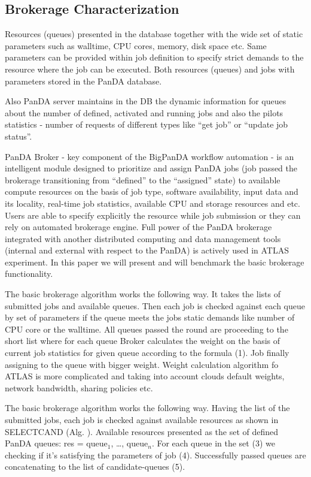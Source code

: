 \subsection{Brokerage Characterization}
\label{subsec:brokerage}

Resources (queues) presented in the database together with the wide set of
static parameters such as walltime, CPU cores, memory, disk space etc. Same
parameters can be provided within job definition to specify strict demands to
the resource where the job can be executed. Both resources (queues) and jobs
with parameters stored in the PanDA database.

Also PanDA server maintains in the DB the dynamic information for queues
about the number of defined, activated and running jobs and also the pilots
statistics - number of requests of different types like ``get job'' or
``update job status''.

PanDA Broker - key  component of the BigPanDA workflow automation - is an
intelligent module designed to prioritize and assign PanDA jobs (job passed
the brokerage transitioning from ``defined'' to the ``assigned'' state) to
available compute resources on the basis of job type, software
availability, input data and its locality, real-time job statistics,
available CPU and storage resources and etc. Users are able to specify
explicitly the resource while job submission or they can rely on automated
brokerage engine. Full power of the PanDA brokerage integrated with another
distributed computing and data management tools (internal and external with
respect to the PanDA) is actively used in ATLAS experiment. In this paper we
will present and will benchmark the basic brokerage functionality.

The basic brokerage algorithm works the following way. It takes the lists of
submitted jobs and available queues. Then each job is checked against each
queue by set of parameters if the queue meets the jobs static demands like
number of CPU core or the walltime. All queues passed the round are
proceeding to the short list where for each queue Broker calculates the
weight on the basis of current job statistics for given queue according to
the formula (1). Job finally assigning to the queue with bigger weight.
Weight calculation algorithm fo ATLAS is more complicated and taking into
account clouds default weights, network bandwidth, sharing policies etc.

The basic brokerage algorithm works the following way. Having the list of the
submitted jobs, each job is checked against available resources as shown in
SELECT{\textunderscore}CAND (Alg. ). Available resources presented as the set
of defined PanDA queues: res = queue$_1$, \ldots, queue$_n$. For each queue
in the set (3) we checking if it's satisfying the parameters of job (4).
Successfully passed queues are concatenating to the list of candidate-queues
(5).


